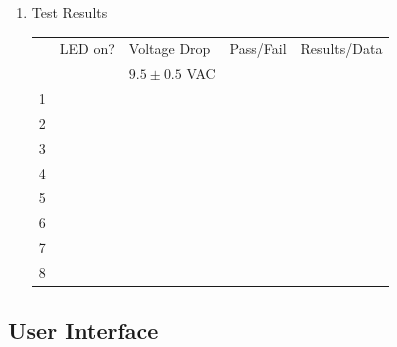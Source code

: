 \documentclass{article}
\begin{document}
\begin{enumerate}
\item Test Results \\
	\vspace{1em}
	\begin{tabular}{|l|l|l|l|l|}
		\hline
		& LED on? & Voltage Drop    & Pass/Fail & Results/Data\hspace{2in} \\
		&         & $9.5\pm0.5$ VAC & & \\
		\hline
		1 &&&& \\
		\hline
		2 &&&& \\
		\hline
		3 &&&& \\
		\hline
		4 &&&& \\
		\hline
		5 &&&& \\
		\hline
		6 &&&& \\
		\hline
		7 &&&& \\
		\hline
		8 &&&& \\
		\hline
	\end{tabular}

\end{enumerate}




\clearpage
\subsection{User Interface}
\end{document}

